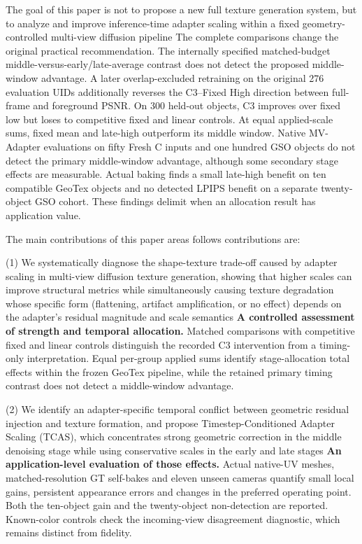 \documentclass[times,twocolumn,final]{elsarticle}
\providecommand{\DIFadd}[1]{{\protect\color{blue} \sf #1}} %
\providecommand{\DIFdel}[1]{{\protect\color{red} \scriptsize #1}} %
\providecommand{\DIFaddbegin}{} %
\providecommand{\DIFaddend}{} %
\providecommand{\DIFdelbegin}{} %
\providecommand{\DIFdelend}{} %
\begin{document}
\DIFdel{The goal of this paper is not to propose a new full texture generation system, but to analyze and improve inference-time adapter scaling within a fixed geometry-controlled multi-view diffusion pipeline}\DIFdelend \DIFaddbegin \DIFadd{The complete comparisons change the original practical recommendation. The internally specified matched-budget middle-versus-early/late-average contrast does not detect the proposed middle-window advantage. A later overlap-excluded retraining on the original 276 evaluation UIDs additionally reverses the C3--Fixed High direction between full-frame and foreground PSNR. On 300 held-out objects, C3 improves over fixed low but loses to competitive fixed and linear controls. At equal applied-scale sums, fixed mean and late-high outperform its middle window. Native MV-Adapter evaluations on fifty Fresh C inputs and one hundred GSO objects do not detect the primary middle-window advantage, although some secondary stage effects are measurable. Actual baking finds a small late-high benefit on ten compatible GeoTex objects and no detected LPIPS benefit on a separate twenty-object GSO cohort. These findings delimit when an allocation result has application value}\DIFaddend .

The \DIFdelbegin \DIFdel{main contributions of this paper areas follows}\DIFdelend \DIFaddbegin \DIFadd{contributions are}\DIFaddend :

(1) \DIFdelbegin \DIFdel{We systematically diagnose the shape-texture trade-off caused by adapter scaling in multi-view diffusion texture generation, showing that higher scales can improve structural metrics while simultaneously causing texture degradation whose specific form (flattening, artifact amplification, or no effect) depends on the adapter's residual magnitude and scale semantics}\DIFdelend \DIFaddbegin \DIFadd{\textbf{A controlled assessment of strength and temporal allocation.} Matched comparisons with competitive fixed and linear controls distinguish the recorded C3 intervention from a timing-only interpretation. Equal per-group applied sums identify stage-allocation total effects within the frozen GeoTex pipeline, while the retained primary timing contrast does not detect a middle-window advantage}\DIFaddend .

(2) \DIFdelbegin \DIFdel{We identify an adapter-specific temporal conflict between geometric residual injection and texture formation, and propose Timestep-Conditioned Adapter Scaling (TCAS), which concentrates strong geometric correction in the middle denoising stage while using conservative scales in the early and late stages}\DIFdelend \DIFaddbegin \DIFadd{\textbf{An application-level evaluation of those effects.} Actual native-UV meshes, matched-resolution GT self-bakes and eleven unseen cameras quantify small local gains, persistent appearance errors and changes in the preferred operating point. Both the ten-object gain and the twenty-object non-detection are reported. Known-color controls check the incoming-view disagreement diagnostic, which remains distinct from fidelity}\DIFaddend .
\end{document}
